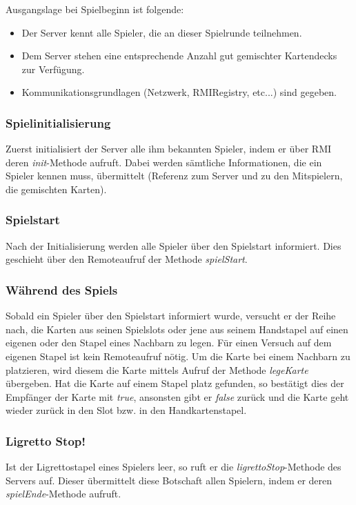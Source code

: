 Ausgangslage bei Spielbeginn ist folgende:
\begin{itemize}
	\item Der Server kennt alle Spieler, die an dieser Spielrunde teilnehmen.
	\item Dem Server stehen eine entsprechende Anzahl gut gemischter Kartendecks zur Verfügung.
	\item Kommunikationsgrundlagen (Netzwerk, RMIRegistry, etc...) sind gegeben.
\end{itemize}

\subsubsection{Spielinitialisierung}
Zuerst initialisiert der Server alle ihm bekannten Spieler, indem er über RMI deren \textit{init}-Methode aufruft. Dabei werden sämtliche Informationen, die ein Spieler kennen muss, übermittelt (Referenz zum Server und zu den Mitspielern, die gemischten Karten).

\subsubsection{Spielstart}
Nach der Initialisierung werden alle Spieler über den Spielstart informiert. Dies geschieht über den Remoteaufruf der Methode \textit{spielStart}.

\subsubsection{Während des Spiels}
Sobald ein Spieler über den Spielstart informiert wurde, versucht er der Reihe nach, die Karten aus seinen Spielslots oder jene aus seinem Handstapel auf einen eigenen oder den Stapel eines Nachbarn zu legen. Für einen Versuch auf dem eigenen Stapel ist kein Remoteaufruf nötig. Um die Karte bei einem Nachbarn zu platzieren, wird diesem die Karte mittels Aufruf der Methode \textit{legeKarte} übergeben. Hat die Karte auf einem Stapel platz gefunden, so bestätigt dies der Empfänger der Karte mit \textit{true}, ansonsten gibt er \textit{false} zurück und die Karte geht wieder zurück in den Slot bzw. in den Handkartenstapel.

\subsubsection{Ligretto Stop!}
Ist der Ligrettostapel eines Spielers leer, so ruft er die \textit{ligrettoStop}-Methode des Servers auf. Dieser übermittelt diese Botschaft allen Spielern, indem er deren \textit{spielEnde}-Methode aufruft.

